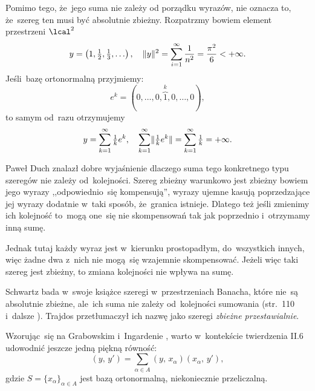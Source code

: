 \documentclass[a4paper,11pt]{article}
\begin{document}
Pomimo tego, że~jego suma nie zależy od porządku wyrazów, nie oznacza
to, że~szereg ten musi być absolutnie zbieżny. Rozpatrzmy bowiem
element przestrzeni $\lcal^{ 2 }$
\begin{equation}
  \label{eq:RS-Vol-I-s01-20}
  y = \left( 1, \tfrac{ 1 }{ 2 }, \tfrac{ 1 }{ 3 }, \ldots \right), \quad
  \lVert{  y  }\rVert^{ 2 }
  = \sum_{ i = 1 }^{ \infty } \frac{ 1 }{ n^{ 2 } }
  = \frac{ \pi^{ 2 } }{ 6 } < +\infty.
\end{equation}
Jeśli~bazę ortonormalną przyjmiemy:
\begin{equation}
  \label{eq:RS-Vol-I-s01-21}
  e^{ k } = ( 0, \ldots, 0, \overbrace{ 1 }^{ k }, 0, \ldots, 0),
\end{equation}
to samym od~razu otrzymujemy
\begin{equation}
  \label{eq:RS-Vol-I-s01-22}
  y =
  \sum_{ k = 1 }^{ \infty } \tfrac{ 1 }{ k } e^{ k }, \quad
  \sum_{ k = 1 }^{ \infty } \lVert{  \tfrac{ 1 }{ k } e^{ k }  }\rVert
  = \sum_{ k = 1 }^{ \infty } \tfrac{ 1 }{ k } = +\infty.
\end{equation}

Paweł Duch znalazł dobre wyjaśnienie dlaczego suma tego konkretnego
typu szeregów nie zależy od~kolejności. Szereg zbieżny warunkowo jest
zbieżny bowiem jego wyrazy ,,odpowiednio~się kompensują'', wyrazy
ujemne kasują poprzedzające jej wyrazy dodatnie w~taki sposób,
że~granica istnieje. Dlatego też jeśli zmienimy ich kolejność to~mogą
one~się nie skompensowań tak jak poprzednio i~otrzymamy inną sumę.

Jednak tutaj każdy wyraz jest w~kierunku prostopadłym, do~wszystkich
innych, więc żadne dwa z~nich nie mogą~się wzajemnie skompensować.
Jeżeli więc taki szereg jest zbieżny, to zmiana kolejności nie wpływa
na sumę.

Schwartz bada w~swoje książce szeregi w~przestrzeniach Banacha, które
nie~są absolutnie zbieżne, ale~ich suma nie zależy od~kolejności
sumowania (str.~110 i~dalsze
\cite{SchwartzKursAnalizyMatematycznejVolI1979}). Trajdos przetłumaczył ich
nazwę jako szeregi \textit{zbieżne przestawialnie}. %

\vspace{\spaceFour}



\start {} Wzorując~się na Grabowskim i~Ingardenie
\cite{GrabowskiIngardenMechanikaKwantowa1987}, warto w~kontekście
twierdzenia II.6 udowodnić jeszcze jedną piękną równość:
\begin{equation}
  \label{eq:RS-Vol-I-s01-23}
  ( y, \, y' ) =
  \sum_{ \alpha \in A } ( y, \, x_{ \alpha } ) ( x_{ \alpha }, \, y' ),
\end{equation}
gdzie $S = \{ x_{ \alpha } \}_{ \alpha \in A }$ jest bazą ortonormalną,
niekoniecznie przeliczalną.
\end{document}
